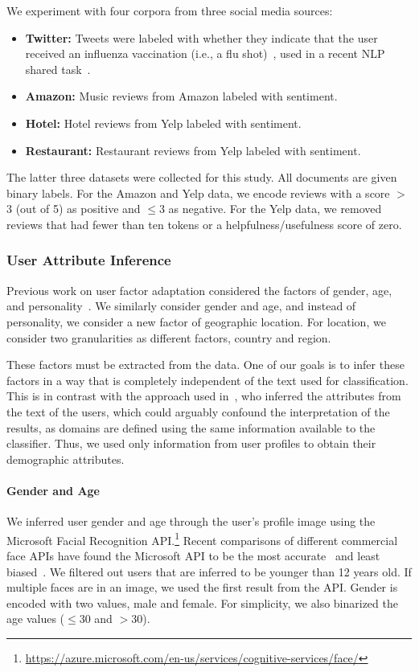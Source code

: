 We experiment with four corpora from three social media sources:
\begin{itemize}
\setlength\itemsep{0ex}
    \item {\bf Twitter:} Tweets were labeled with whether they indicate that the user received an influenza vaccination (i.e., a flu shot)~\cite{huang2017examining},
    used in a recent NLP shared task~\cite{W18-5904}.
    \item {\bf Amazon:} Music reviews from Amazon labeled with sentiment.
    \item {\bf Hotel:} Hotel reviews from Yelp labeled with sentiment.
    \item {\bf Restaurant:} Restaurant reviews from Yelp labeled with sentiment.
\end{itemize}

The latter three datasets were collected for this study.
All documents are given binary labels.
For the Amazon and Yelp data, we encode reviews with a score $>$$3$ (out of 5) as positive and $\leq$$3$ as negative.
For the Yelp data, we removed reviews that had fewer than ten tokens or a helpfulness/usefulness score of zero. 


\subsubsection{User Attribute Inference}

Previous work on user factor adaptation considered the factors of gender, age, and personality~\cite{lynn2017human}.
We similarly consider gender and age, and instead of personality, we consider a new factor of geographic location.
For location, we consider two granularities as different factors, country and region.

These factors must be extracted from the data.
One of our goals is to infer these factors
in a way that is completely independent of the text used for classification.
This is in contrast with the approach used in~\cite{lynn2017human, wood2020using},
who inferred the attributes from the text of the users,
which could arguably confound the interpretation of the results,
as domains are defined using the same information available to the classifier.
Thus, we used only information from user profiles to obtain their demographic attributes.


\paragraph{Gender and Age} 
We inferred user gender and age through the user's profile image using the Microsoft Facial Recognition API.\footnote{\url{https://azure.microsoft.com/en-us/services/cognitive-services/face/}}
Recent comparisons of different commercial face APIs have found the Microsoft API to be the most accurate~\cite{jung2018assessing} and least biased~\cite{buolamwini2018gender}.
We filtered out users that are inferred to be younger than 12 years old. If multiple faces are in an image, we used the first result from the API. 
Gender is encoded with two values, male and female. 
For simplicity, we also binarized the age values ($\leq$$30$ and $>$$30$).

